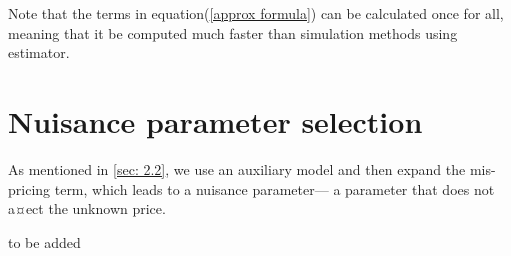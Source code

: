 Note that the terms in equation(\eqref{approx formula}) can be calculated once for all, meaning that it be computed much faster than simulation methods using estimator.

\section{Nuisance parameter selection}
\label{sec: 2.3}

As mentioned in \ref{sec: 2.2}, we use an auxiliary model and then expand the mis-pricing term, which leads to a nuisance parameter— a parameter that does not a¤ect the unknown price.

to be added


